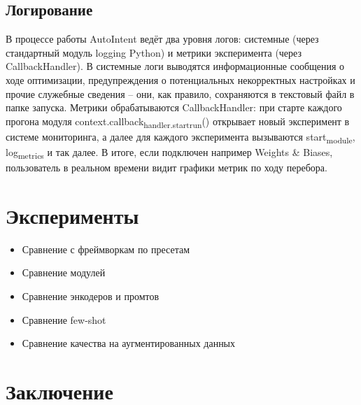 \documentclass[14pt,a4paper,oneside,openany]{extbook}
\begin{document}
\section{Логирование}
\label{sec:orge8e4b58}
В процессе работы AutoIntent ведёт два уровня логов: системные (через стандартный модуль logging Python) и метрики эксперимента (через CallbackHandler). В системные логи выводятся информационные сообщения о ходе оптимизации, предупреждения о потенциальных некорректных настройках и прочие служебные сведения – они, как правило, сохраняются в текстовый файл в папке запуска. Метрики обрабатываются CallbackHandler: при старте каждого прогона модуля context.callback\textsubscript{handler.start}\textsubscript{run}() открывает новый эксперимент в системе мониторинга, а далее для каждого эксперимента вызываются start\textsubscript{module}, log\textsubscript{metrics} и так далее. В итоге, если подключен например Weights \& Biases, пользователь в реальном времени видит графики метрик по ходу перебора.
\chapter{Эксперименты}
\label{sec:org7a2223b}

\begin{itemize}
\item Сравнение с фреймворкам по пресетам
\item Сравнение модулей
\item Сравнение энкодеров и промтов
\item Сравнение few-shot
\item Сравнение качества на аугментированных данных
\end{itemize}
\chapter*{Заключение}
\label{sec:org5874709}
\printbibliography[title=СПИСОК\spaceИСПОЛЬЗОВАНЫХ\spaceИСТОЧНИКОВ]
\end{document}
